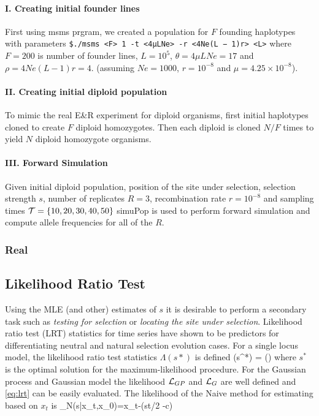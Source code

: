 \paragraph{I. Creating initial founder lines}
First using msms prgram, we created a population for $F$ founding haplotypes with parameters \texttt{\$./msms <F> 1 -t <4μLNe> -r <4Ne(L − 1)r> <L>} where $F=200$ is number of founder lines, 
$L=10^5$, $\theta=4\mu LNe=17$ and $\rho=4Ne(L-1)r=4$.  (assuming $Ne=1000$, $r=10^{-8}$ and $\mu=4.25\times 10^{-8}$).  
\paragraph{II. Creating initial diploid population} 
To mimic the real E\&R experiment for diploid organisms, first initial haplotypes cloned to create $F$ diploid homozygotes. Then each diploid is cloned $N/F$ times to yield $N$ diploid homozygote organisms.
\paragraph{III. Forward Simulation}
Given initial diploid population, position of the site under selection, selection strength $s$, number of replicates $R=3$, recombination rate $r=10^{-8}$ and sampling times ${\cal T}=\{10,20,30,40,50\}$ simuPop is used to perform forward simulation and compute allele frequencies for all of the $R$.

\subsubsection{Real}

\subsection{Likelihood Ratio Test}
Using the MLE (and other) estimates of $s$ it is desirable to perform a secondary task such as \emph{testing for selection} or \emph{locating the site under selection}. Likelihood ratio test (LRT) statistics for time series \cite{feder2014} have shown to be predictors for differentiating neutral and natural selection evolution cases. For a single locus model, the likelihood ratio test statistics $\Lambda(s*)$ is defined
\beq \label{eq:lrt}
\Lambda(s^*) = \log \left(\right)
\eeq
where $s^*$ is the optimal solution for the maximum-likelihood procedure. For the Gaussian process and Gaussian model the likelihood ${\cal L}_{GP}$ and ${\cal L}_G$ are well defined and \eqref{eq:lrt} can be easily evaluated. The likelihood of the Naive method for estimating based on $x_t$ is 
\beq
\Lc_N(s|x_t,x_0)=x_t-\sigma(st/2 -c)
\eeq


